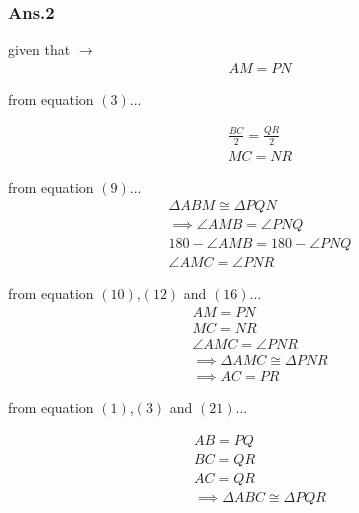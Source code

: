 \documentclass{beamer}
\begin{document}
       	\begin{frame}
       		\frametitle{Ans.2}
       		\begin{multicols}{2}
       		given that $\to$\\
       		\begin{align}
       			AM = PN
       		\end{align}
       		
       		from equation $\left(3\right)$...
       		
       		\begin{align}
       			\frac{BC}{2} = \frac{QR}{2} \\
       			MC = NR
       		\end{align}	
       
     		from equation $\left(9\right)$...
     	\begin{align}
     		\Delta ABM \cong \Delta PQN 
     		\\
     		\implies \angle AMB = \angle PNQ
     		\\
     		180 - \angle AMB = 180 -  \angle PNQ
     		\\
     		\angle AMC = \angle PNR
     	\end{align}
     	\end{multicols}
     \end{frame}
     \begin{frame}
     	\begin{multicols}{2}
     	from equation $\left(10\right)$,$\left(12\right)$ and $\left(16\right)$...
     	\begin{align}
     		AM = PN
     		\\
     		MC = NR
     		\\
     		\angle AMC = \angle PNR
     		\\
     		\implies  \Delta AMC \cong \Delta PNR
     		\\
     		\implies AC = PR
     	\end{align}
     	
 
 		from equation $\left(1\right)$,$\left(3\right)$ and $\left(21\right)$...
 	
 		\begin{align}
 			AB = PQ\\
 			BC = QR\\
 			AC = QR\\
 			\implies  \Delta ABC \cong \Delta PQR
 		\end{align}
 		\end{multicols}
 	\end{frame}
\end{document}
